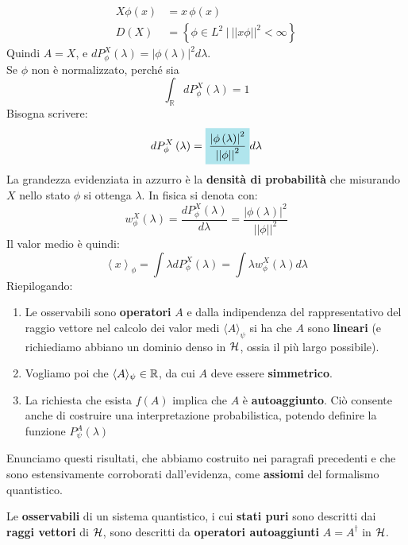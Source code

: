 \documentclass[../../FisicaTeorica.tex]{subfiles}
\begin{document}
\begin{align*}
    X\phi \left(x\right)&=x\,\phi \left(x\right)\\
    D\left(X\right)&=\left\{\phi\in L^2\ |\ \left|\left|x\phi\right|\right|^2<\infty\right\}
\end{align*}
Quindi $A=X$, e $dP_\phi^X(\lambda) = |\phi(\lambda)|^2 d\lambda$.\\
Se $\phi$  non è normalizzato, perché sia \[ \int_{\mathbb{R}}{dP_\phi^X\left(\lambda\right)}=1 \]
Bisogna scrivere:
\[
dP_\phi^X\left(\lambda\right)=\hlc{SkyBlue}{\frac{\left|\phi\left(\lambda\right)\right|^2}{\left|\left|\phi\right|\right|^2}}d\lambda 
\]
La grandezza evidenziata in azzurro è la \textbf{densità di probabilità} che misurando $X$ nello stato $\phi$ si ottenga $\lambda$. In fisica si denota con:
\[
w_\phi^X\left(\lambda\right)=\frac{dP_\phi^X\left(\lambda\right)}{d\lambda}=\frac{\left|\phi\left(\lambda\right)\right|^2}{\left|\left|\phi\right|\right|^2}
\]
Il valor medio è quindi:
\[
\left\langle x\right\rangle_\phi=\int \lambda  dP_\phi^X\left(\lambda\right)=\int \lambda  w_\phi^X\left(\lambda\right) d\lambda 
\]
Riepilogando: 
\begin{enumerate}
    \item Le osservabili sono \textbf{operatori} $A$ e dalla indipendenza del rappresentativo del raggio vettore nel calcolo dei valor medi $\langle A\rangle_\psi$ si ha che $A$ sono \textbf{lineari} (e richiediamo abbiano un dominio denso in $\mathcal{H}$, ossia il più largo possibile).
    \item Vogliamo poi che $\langle A \rangle_\psi \in \mathbb{R}$, da cui $A$ deve essere \textbf{simmetrico}.
    \item La richiesta che esista $f\left(A\right)$ implica che $A$ è \textbf{autoaggiunto}.  Ciò consente anche di costruire una interpretazione probabilistica, potendo definire la funzione $P_\psi^A\left(\lambda\right)$
\end{enumerate}
Enunciamo questi risultati, che abbiamo costruito nei paragrafi precedenti e che sono estensivamente corroborati dall'evidenza, come \textbf{assiomi} del formalismo quantistico.
\begin{axi}
Le \textbf{osservabili} di un sistema quantistico, i cui \textbf{stati puri} sono descritti dai \textbf{raggi vettori} di $\mathcal{H}$, sono descritti da \textbf{operatori autoaggiunti} $A=A^\dag$ in $\mathcal{H}$.
\end{axi}
\end{document}
